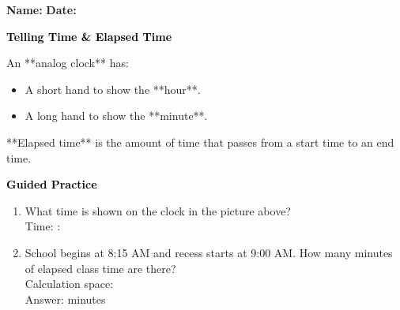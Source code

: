 \documentclass[12pt, letterpaper, fleqn]{article}
\newcommand{\blank}{\underline{\hspace{2.2cm}}}
\begin{document}
\textbf{Name:} \underline{\hspace{5cm}}
\hfill
\textbf{Date:} \underline{\hspace{3cm}}\\

\begin{tcolorbox}[colback=customteal!20]
    \large\textcolor{black}{\textbf{Telling Time \& Elapsed Time}}
\end{tcolorbox}

\vspace{3mm}
\noindent
An **analog clock** has:
\begin{itemize}
    \item A short hand to show the **hour**.
    \item A long hand to show the **minute**.
\end{itemize}
**Elapsed time** is the amount of time that passes from a start time to an end time.

\begin{center}
\end{center}

\newpage
\begin{tcolorbox}[colback=customteal!20]
    \large\textcolor{black}{\textbf{Guided Practice}}
\end{tcolorbox}

\vspace{5mm}
\begin{enumerate}[itemsep=3cm, leftmargin=0.6cm]
\item What time is shown on the clock in the picture above?
\\
Time: \blank : \blank

\item School begins at 8:15 AM and recess starts at 9:00 AM. How many minutes of elapsed class time are there?
\\
Calculation space: \vspace{2cm}
\\
Answer: \blank minutes
\end{enumerate}
\end{document}

